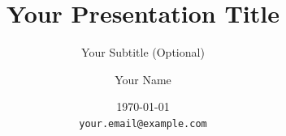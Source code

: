 \documentclass[aspectratio=916]{beamer}
\title{Your Presentation Title}
\subtitle{Your Subtitle (Optional)}
\author{Your Name}
\institute{Your Institution}
\date{\today\\\small\texttt{your.email@example.com}}
\begin{document}
\begin{frame}
  \titlepage
\end{frame}

%   
%   
%   


\end{document}
